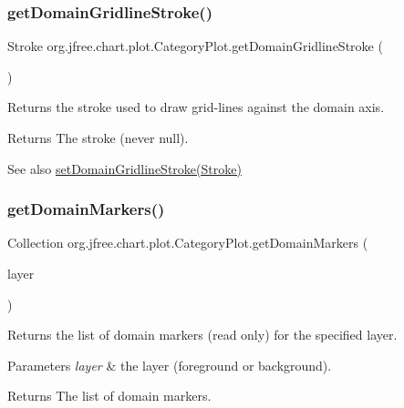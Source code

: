 \subsubsection{\texorpdfstring{get\+Domain\+Gridline\+Stroke()}{getDomainGridlineStroke()}}
{\footnotesize\ttfamily Stroke org.\+jfree.\+chart.\+plot.\+Category\+Plot.\+get\+Domain\+Gridline\+Stroke (\begin{DoxyParamCaption}{ }\end{DoxyParamCaption})}

Returns the stroke used to draw grid-\/lines against the domain axis.

\begin{DoxyReturn}{Returns}
The stroke (never {\ttfamily null}).
\end{DoxyReturn}
\begin{DoxySeeAlso}{See also}
\mbox{\hyperlink{classorg_1_1jfree_1_1chart_1_1plot_1_1_category_plot_adc1912c7460d4b7cfbf5cec73e21c31b}{set\+Domain\+Gridline\+Stroke(\+Stroke)}} 
\end{DoxySeeAlso}
\mbox{\label{classorg_1_1jfree_1_1chart_1_1plot_1_1_category_plot_af84d9f985f71bc0f0e11d52f4f505d91}} 
\subsubsection{\texorpdfstring{get\+Domain\+Markers()}{getDomainMarkers()}\hspace{0.1cm}{\footnotesize\ttfamily [1/2]}}
{\footnotesize\ttfamily Collection org.\+jfree.\+chart.\+plot.\+Category\+Plot.\+get\+Domain\+Markers (\begin{DoxyParamCaption}\item[{Layer}]{layer }\end{DoxyParamCaption})}

Returns the list of domain markers (read only) for the specified layer.


\begin{DoxyParams}{Parameters}
{\em layer} & the layer (foreground or background).\\
\hline
\end{DoxyParams}
\begin{DoxyReturn}{Returns}
The list of domain markers. 
\end{DoxyReturn}
\mbox{\label{classorg_1_1jfree_1_1chart_1_1plot_1_1_category_plot_adebc94ca184b69f6244251d281b847a7}} 
